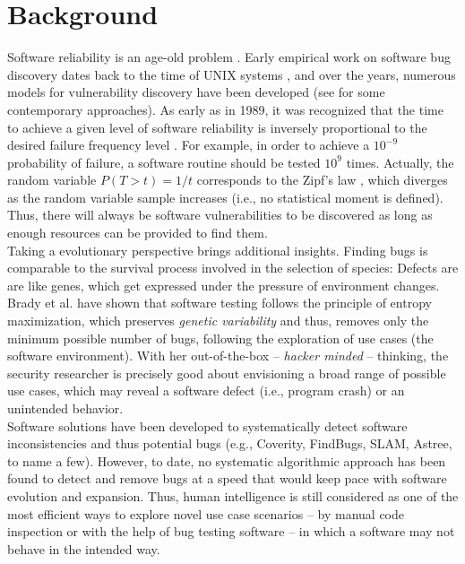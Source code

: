\section{Background}
\label{sec:related}

Software reliability is an age-old problem \cite{littlewood1973bayesian,adams1984textordfeminineoptimizing,littlewood1989predicting}. Early empirical work on software bug discovery dates back to the time of UNIX systems \cite{miller1990empirical}, and over the years, numerous models for vulnerability discovery have been developed (see \cite{avgerinos2014enhancing,zhao2016empirical} for some contemporary approaches). As early as in 1989, it was recognized that the time to achieve a given level of software reliability is inversely proportional to the desired failure frequency level \cite{adams1984textordfeminineoptimizing}. For example, in order to achieve a $10^{-9}$ probability of failure, a software routine should be tested  $10^{9}$ times. Actually, the random variable $P(T > t) = 1/t$ corresponds to the Zipf's law \cite{maillart2008empirical,saichev2009theory}, which diverges as the random variable sample increases (i.e., no statistical moment is defined). Thus, there will always be software vulnerabilities to be discovered as long as enough resources can be provided to find them.\\

Taking a evolutionary perspective brings additional insights. Finding bugs is comparable to the survival process involved in the selection of species: Defects are are like genes, which get expressed under the pressure of environment changes. Brady et al. \cite{brady1999murphy} have shown that software testing follows the principle of entropy maximization, which preserves {\it genetic variability}  and thus, removes only the minimum possible number of bugs, following the exploration of use cases (the software environment). With her out-of-the-box -- {\it hacker minded} -- thinking, the security researcher is precisely good about envisioning a broad range of possible use cases, which may reveal a software defect (i.e., program crash) or an unintended behavior.\\

Software solutions have been developed to systematically detect software inconsistencies and thus potential bugs (e.g., Coverity, FindBugs, SLAM, Astree, to name a few). However, to date, no systematic algorithmic approach has been found to detect and remove bugs at a speed that would keep pace with software evolution and expansion. Thus, human intelligence is still considered as one of the most efficient ways to explore novel use case scenarios -- by manual code inspection or with the help of bug testing software -- in which a software may not behave in the intended way.\\

